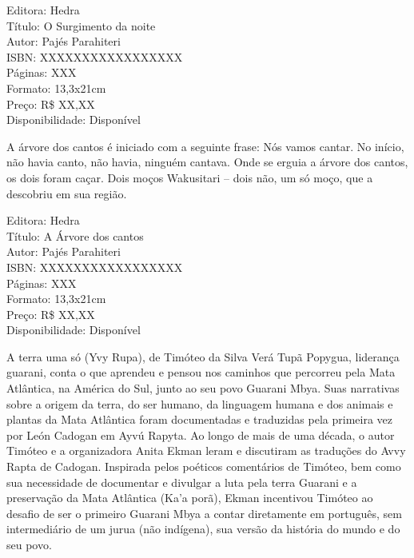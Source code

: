 \begin{ficha}
Editora: Hedra\\
Título: O Surgimento da noite\\
Autor:  Pajés Parahiteri\\ 
ISBN: XXXXXXXXXXXXXXXXX\\
Páginas: XXX\\
Formato: 13,3x21cm\\
Preço: R\$ XX,XX\\
Disponibilidade: Disponível
\end{ficha}

\pagebreak


\noindent{}A árvore dos cantos é iniciado com a seguinte frase: Nós vamos cantar. No início, não havia canto, não havia, ninguém cantava. Onde se erguia a árvore dos cantos, os dois foram caçar. Dois moços Wakusitari – dois não, um só moço, que a descobriu em sua região.

\begin{ficha}
Editora: Hedra\\
Título: A Árvore dos cantos\\
Autor:  Pajés Parahiteri\\ 
ISBN: XXXXXXXXXXXXXXXXX\\
Páginas: XXX\\
Formato: 13,3x21cm\\
Preço: R\$ XX,XX\\
Disponibilidade: Disponível
\end{ficha}

\pagebreak


\noindent{}A terra uma só (Yvy Rupa), de Timóteo da Silva Verá Tupã Popygua, liderança guarani, conta o que aprendeu e pensou nos caminhos que percorreu pela Mata Atlântica, na América do Sul, junto ao seu povo Guarani Mbya. Suas narrativas sobre a origem da terra, do ser humano, da linguagem humana e dos animais e plantas da Mata Atlântica foram documentadas e traduzidas pela primeira vez por León Cadogan em Ayvú Rapyta. Ao longo de mais de uma década, o autor Timóteo e a organizadora Anita Ekman leram e discutiram as traduções do Avvy Rapta de Cadogan. Inspirada pelos poéticos comentários de Timóteo, bem como sua necessidade de documentar e divulgar a luta pela terra Guarani e a preservação da Mata Atlântica (Ka’a porã), Ekman incentivou Timóteo ao desafio de ser o primeiro Guarani Mbya a contar diretamente em português, sem intermediário de um jurua (não indígena), sua versão da história do mundo e do seu povo.

